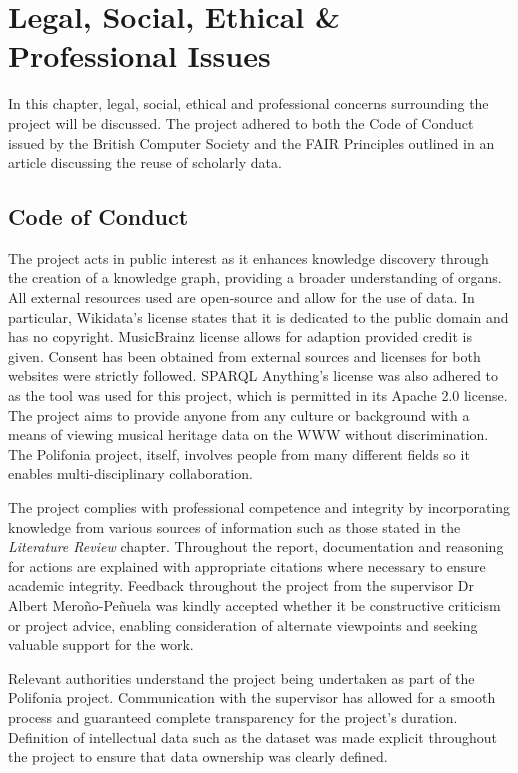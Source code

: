 \chapter{Legal, Social, Ethical \& Professional Issues} 
In this chapter, legal, social, ethical and professional concerns surrounding the project will be discussed. The project adhered to both the Code of Conduct issued by the British Computer Society \cite{bcs} and the FAIR Principles \cite{fairprinciples} outlined in an article discussing the reuse of scholarly data.

\section{Code of Conduct}
\hspace{0.5cm} The project acts in public interest as it enhances knowledge discovery through the creation of a knowledge graph, providing a broader understanding of organs. All external resources used are open-source and allow for the use of data. In particular, Wikidata's license \cite{wikidatalicense} states that it is dedicated to the public domain and has no copyright. MusicBrainz license \cite{musicbrainzlicense} allows for adaption provided credit is given. Consent has been obtained from external sources and licenses for both websites were strictly followed. SPARQL Anything's license \cite{apachelicense} was also adhered to as the tool was used for this project, which is permitted in its Apache 2.0 license. The project aims to provide anyone from any culture or background with a means of viewing musical heritage data on the WWW without discrimination. The Polifonia project, itself, involves people from many different fields so it enables multi-disciplinary collaboration. 

The project complies with professional competence and integrity by incorporating knowledge from various sources of information such as those stated in the \textit{Literature Review} chapter. Throughout the report, documentation and reasoning for actions are explained with appropriate citations where necessary to ensure academic integrity. Feedback throughout the project from the supervisor Dr Albert Mero{\~n}o-Pe{\~n}uela was kindly accepted whether it be constructive criticism or project advice, enabling consideration of alternate viewpoints and seeking valuable support for the work.

Relevant authorities understand the project being undertaken as part of the Polifonia project. Communication with the supervisor has allowed for a smooth process and guaranteed complete transparency for the project's duration. Definition of intellectual data such as the dataset was made explicit throughout the project to ensure that data ownership was clearly defined.

